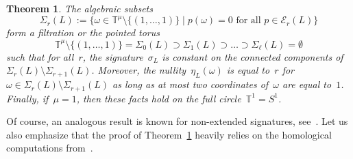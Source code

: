 \documentclass{amsart}
\newcommand{\T}{\mathbb{T}}
\newtheorem{thm}{Theorem}[section]
\theoremstyle{definition}
\theoremstyle{remark}
\begin{document}
	\begin{thm}
		\label{thm:main}
		The algebraic subsets
		\[
		\Sigma_r(L):=\{\omega\in\T^\mu\setminus\{(1,\dots,1)\}\mid p(\omega)=0\text{ for all } p\in\mathcal{E}_{r}(L)\}
		\]
		form a filtration or the pointed torus
		\[
		\T^\mu\setminus\{(1,\dots,1)\}=\Sigma_0(L)\supset\Sigma_1(L)\supset\dots\supset\Sigma_\ell(L)=\emptyset
		\]
		such that for all~$r$, the signature~$\sigma_L$ is constant on the connected components of~$\Sigma_r(L)\setminus\Sigma_{r+1}(L)$. Moreover, the nullity~$\eta_L(\omega)$ is equal to~$r$ for~$\omega\in\Sigma_r(L)\setminus\Sigma_{r+1}(L)$ as long as at most two coordinates of~$\omega$ are equal to~$1$.
		Finally, if~$\mu=1$, then these facts hold on the full circle~$\T^1=S^1$.
	\end{thm}

	Of course, an analogous result is known for non-extended signatures, see~\cite[Theorem~4.1]{CF08}. Let us also emphasize that the proof of Theorem~\ref{thm:main} heavily relies on the homological computations from~\cite[Appendix B]{CMP23}.
\end{document}

